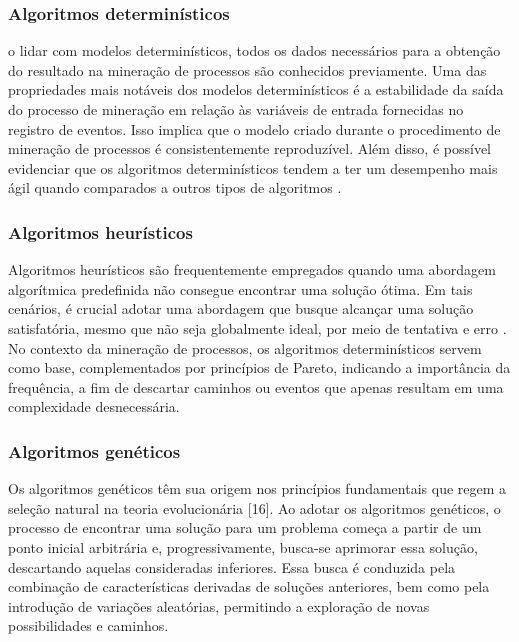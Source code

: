 \documentclass[tcc2]{classe_uftex/uftex}
\begin{document}
\subsubsection{Algoritmos determinísticos}

    o lidar com modelos determinísticos, todos os dados necessários para a obtenção do resultado na mineração de processos são conhecidos previamente. Uma das propriedades mais notáveis dos modelos determinísticos é a estabilidade da saída do processo de mineração em relação às variáveis de entrada fornecidas no registro de eventos. Isso implica que o modelo criado durante o procedimento de mineração de processos é consistentemente reproduzível. Além disso, é possível evidenciar que os algoritmos determinísticos tendem a ter um desempenho mais ágil quando comparados a outros tipos de algoritmos \cite{colacco2011survey}. 

    \subsubsection{Algoritmos heurísticos}

    Algoritmos heurísticos são frequentemente empregados quando uma abordagem algorítmica predefinida não consegue encontrar uma solução ótima. Em tais cenários, é crucial adotar uma abordagem que busque alcançar uma solução satisfatória, mesmo que não seja globalmente ideal, por meio de tentativa e erro \cite{winston2004operations}. No contexto da mineração de processos, os algoritmos determinísticos servem como base, complementados por princípios de Pareto, indicando a importância da frequência, a fim de descartar caminhos ou eventos que apenas resultam em uma complexidade desnecessária.
    
\subsubsection{Algoritmos genéticos} 

    Os algoritmos genéticos têm sua origem nos princípios fundamentais que regem a seleção natural na teoria evolucionária [16]. Ao adotar os algoritmos genéticos, o processo de encontrar uma solução para um problema começa a partir de um ponto inicial arbitrária e, progressivamente, busca-se aprimorar essa solução, descartando aquelas consideradas inferiores. Essa busca é conduzida pela combinação de características derivadas de soluções anteriores, bem como pela introdução de variações aleatórias, permitindo a exploração de novas possibilidades e caminhos.
\end{document}
